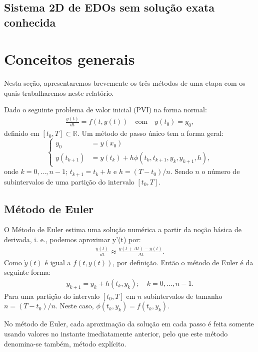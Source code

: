 \documentclass[twocolumn,amsmath,amssymb,floatfix]{revtex4}
\begin{document}
\subsection{Sistema 2D de EDOs sem solução exata conhecida}
\label{subsec:sistemaEdoDesconhcido}

\section{Conceitos generais}
Nesta seção, apresentaremos brevemente os três métodos de uma etapa com os quais trabalharemos neste relatório.

Dado o seguinte problema de valor inicial (PVI) na forma normal:
\begin{eqnarray}
\frac{y(t)}{dt}=f(t, y(t)) \quad \text{com} \quad y(t_0)=y_0,
\end{eqnarray}
definido em $[t_0,T]\subset \mathbb{R}$.
Um método de passo único tem a forma geral:
\begin{equation}
\left\{\begin{array}{rl}
    y_0 &= y(x_0)  \\
    y(t_{k+1}) &= y(t_{k})+h\phi(t_k,t_{k+1},y_k,y_{k+1},h),
\end{array}\right.
\end{equation}
onde $k=0,...,n-1$; $t_{k+1}=t_k+h$ e $h=(T-t_0)/n$. Sendo $n$ o número de subintervalos de uma partição do intervalo $[t_0,T]$.

\subsection{Método de Euler}
O Método de Euler estima uma solução numérica a partir da noção b\'asica de derivada, i. e.,
podemos aproximar y'(t) por:
\begin{eqnarray}
\frac{y(t)}{dt}\approx \frac{y(t+\Delta t)-y(t)}{\Delta t}.
\end{eqnarray}
Como $\dot y(t)$ é igual a $f(t, y(t))$, por definição. Então o método de Euler é da seguinte forma:
\begin{eqnarray}
y_{k+1}= y_k + h(t_k, y_k);\quad k=0,...,n-1.
\end{eqnarray}
Para uma partição do intervalo $[t_0,T]$ em $n$ subintervalos de tamanho $n=(T-t_0)/n$. Neste caso, $\phi(t_k,y_k)=f(t_k,y_k)$.

No método de Euler, cada aproximação da solução em cada passo é feita somente usando valores no instante imediatamente anterior, pelo que este método denomina-se também, método explícito.
\end{document}
